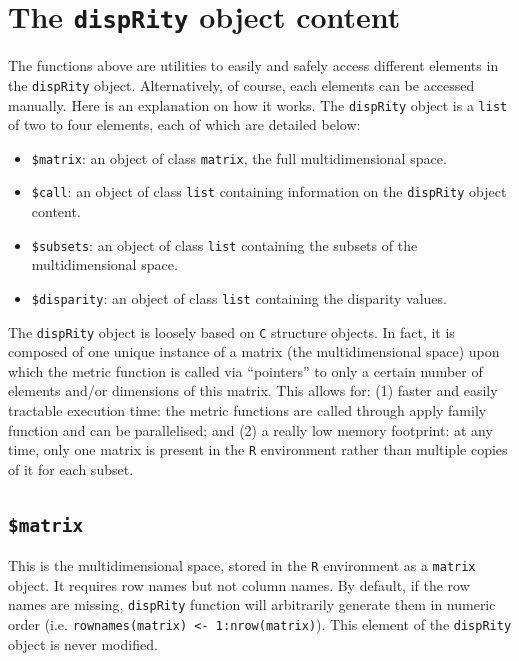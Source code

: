 \documentclass[]{book}
\providecommand{\tightlist}{%
  \setlength{\itemsep}{0pt}\setlength{\parskip}{0pt}}
\theoremstyle{definition}
\theoremstyle{definition}
\theoremstyle{remark}
\begin{document}
\section{\texorpdfstring{The \texttt{dispRity} object
content}{The dispRity object content}}\label{the-disprity-object-content}

The functions above are utilities to easily and safely access different
elements in the \texttt{dispRity} object. Alternatively, of course, each
elements can be accessed manually. Here is an explanation on how it
works. The \texttt{dispRity} object is a \texttt{list} of two to four
elements, each of which are detailed below:

\begin{itemize}
\tightlist
\item
  \texttt{\$matrix}: an object of class \texttt{matrix}, the full
  multidimensional space.
\item
  \texttt{\$call}: an object of class \texttt{list} containing
  information on the \texttt{dispRity} object content.
\item
  \texttt{\$subsets}: an object of class \texttt{list} containing the
  subsets of the multidimensional space.
\item
  \texttt{\$disparity}: an object of class \texttt{list} containing the
  disparity values.
\end{itemize}

The \texttt{dispRity} object is loosely based on \texttt{C} structure
objects. In fact, it is composed of one unique instance of a matrix (the
multidimensional space) upon which the metric function is called via
``pointers'' to only a certain number of elements and/or dimensions of
this matrix. This allows for: (1) faster and easily tractable execution
time: the metric functions are called through apply family function and
can be parallelised; and (2) a really low memory footprint: at any time,
only one matrix is present in the \texttt{R} environment rather than
multiple copies of it for each subset.

\subsection{\texorpdfstring{\texttt{\$matrix}}{\$matrix}}\label{matrix}

This is the multidimensional space, stored in the \texttt{R} environment
as a \texttt{matrix} object. It requires row names but not column names.
By default, if the row names are missing, \texttt{dispRity} function
will arbitrarily generate them in numeric order (i.e.
\texttt{rownames(matrix)\ \textless{}-\ 1:nrow(matrix)}). This element
of the \texttt{dispRity} object is never modified.
\end{document}
